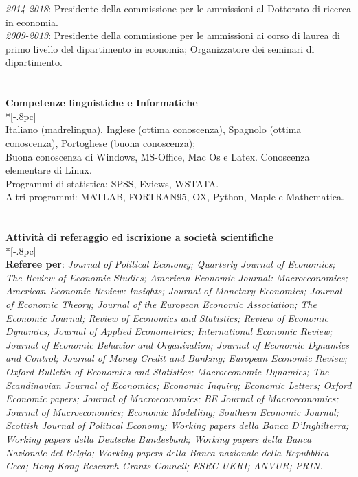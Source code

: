 \documentclass[10p]{article}
\begin{document}
\emph{2014-2018}: Presidente della commissione per le ammissioni al Dottorato di ricerca in economia.\\
\emph{2009-2013}: Presidente della commissione per le ammissioni ai corso di laurea di primo livello del dipartimento in economia; Organizzatore dei seminari di dipartimento.\\
\\
\\
{\large \bf Competenze linguistiche e Informatiche} \\*[-.8pc]
\underline{\hspace{6in}} \\
Italiano (madrelingua), Inglese (ottima conoscenza), Spagnolo (ottima conoscenza), Portoghese (buona conoscenza);\\
Buona conoscenza di Windows, MS-Office, Mac Os e Latex. Conoscenza elementare di Linux.\\
Programmi di statistica: SPSS, Eviews, WSTATA.\\
Altri programmi: MATLAB, FORTRAN95, OX, Python, Maple e Mathematica.
\\
\\
\\
{\large \bf Attivit\`{a} di referaggio ed iscrizione a societ\`{a} scientifiche} \\*[-.8pc]
\underline{\hspace{6in}} \\
\textbf{Referee per}: \emph{Journal of Political Economy; Quarterly Journal of Economics; The Review of Economic Studies; American Economic Journal: Macroeconomics; American Economic Review: Insights; Journal of Monetary Economics; Journal of Economic Theory; Journal of the European Economic Association; The Economic Journal; Review of Economics and Statistics; Review of Economic Dynamics; Journal of Applied Econometrics; International Economic Review; Journal of Economic Behavior and Organization; Journal of Economic Dynamics and Control;  Journal of Money Credit and Banking; European Economic Review; Oxford Bulletin of Economics and Statistics; Macroeconomic Dynamics; The Scandinavian Journal of Economics; Economic Inquiry; Economic Letters; Oxford Economic papers; Journal of Macroeconomics; BE Journal of Macroeconomics; Journal of Macroeconomics; Economic Modelling; Southern Economic Journal; Scottish Journal of Political Economy; Working papers della Banca D'Inghilterra; Working papers della Deutsche Bundesbank; Working papers della Banca Nazionale del Belgio; Working papers della Banca nazionale della Repubblica Ceca; Hong Kong Research Grants Council; ESRC-UKRI; ANVUR; PRIN.}\\
\end{document}
